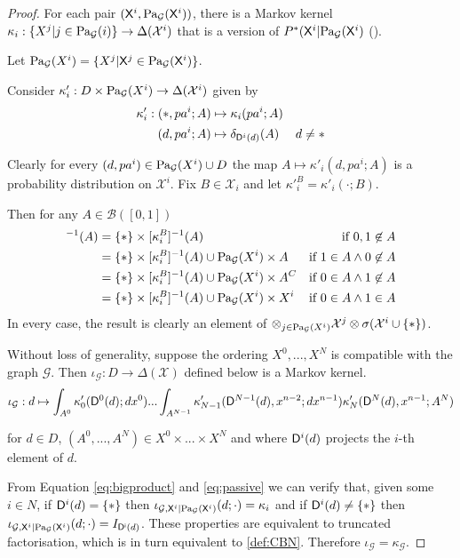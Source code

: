 \begin{proof}
For each pair $(\mathsf{X}^i,\text{Pa}_{\mathcal{G}}(\mathsf{X}^i))$, there is a Markov kernel $\kappa_i:\{X^j|j\in \text{Pa}_{\mathcal{G}}(i)\}\to \Delta(\mathcal{X}^i)$ that is a version of $P^*(\mathsf{X}^i|\text{Pa}_{\mathcal{G}}(\mathsf{X}^i)$ (\cite{cinlar_probability_2011}). 

Let $\text{Pa}_{\mathcal{G}}(X^i) = \{X^j|\mathsf{X}^j\in \text{Pa}_{\mathcal{G}}(\mathsf{X}^i)\}$.

Consider $\kappa'_i:D\times \text{Pa}_{\mathcal{G}}(X^i) \to \Delta(\mathcal{X}^i)$ given by \begin{align}
    \kappa'_i: (*,pa^i;A)&\mapsto \kappa_i(pa^i;A)&\label{eq:passive}\\
               (d,pa^i;A)&\mapsto \delta_{\mathsf{D}^i(d)}(A)&d\neq *\label{eq:npassive}
\end{align}

Clearly for every $(d,pa^i) \in \text{Pa}_{\mathcal{G}}(X^i)\cup D$ the map $A\mapsto \kappa'_i(d,pa^i;A)$ is a probability distribution on $\mathcal{X}^i$. Fix $B\in\mathcal{X}_i$ and let $\kappa'^B_i=\kappa'_i(\cdot;B)$.

Then for any $A\in \mathcal{B}([0,1])$
\begin{align}
    [\kappa'^B_i]^{-1}(A) &= \{*\}\times[\kappa^B_i]^{-1}(A) &\text{if }0,1\not\in A\\
    &= \{*\}\times[\kappa^B_i]^{-1}(A)\cup \PA{\mathcal{G}}{X^i}\times A &\text{if }1\in A\land 0\not\in A\\
    &= \{*\}\times[\kappa^B_i]^{-1}(A)\cup \PA{\mathcal{G}}{X^i}\times A^C &\text{if }0\in A\land 1\not\in A\\
    &= \{*\}\times[\kappa^B_i]^{-1}(A)\cup \PA{\mathcal{G}}{X^i}\times X^i &\text{if }0\in A\land 1\in A
\end{align}
In every case, the result is clearly an element of $\otimes_{j\in \text{Pa}_{\mathcal{G}}(X^i)} \mathcal{X}^j \otimes \sigma(\mathcal{X}^i\cup\{*\})$.

Without loss of generality, suppose the ordering $X^0,...,X^N$ is compatible with the graph $\mathcal{G}$. Then $\iota_{\mathcal{G}}:D\to \Delta(\mathcal{X})$ defined below is a Markov kernel.
\begin{align}
    \iota_{\mathcal{G}}:d\mapsto \int_{A^0} \kappa'_0(\mathsf{D}^0(d);dx^0) ... \int_{A^{N-1}} \kappa'_{N-1}(\mathsf{D}^{N-1}(d),x^{n-2};dx^{n-1}) \kappa'_N(\mathsf{D}^N(d),x^{n-1};A^N) \label{eq:bigproduct}
\end{align}

for $d\in D$, $(A^0,...,A^N)\in X^0\times...\times X^N$ and where $\mathsf{D}^i(d)$ projects the $i$-th element of $d$.

From Equation \ref{eq:bigproduct} and \ref{eq:passive} we can verify that, given some $i\in N$, if $\mathsf{D}^i(d)=\{*\}$ then $\iota_{\mathcal{G},\mathsf{X}^i|\text{Pa}_{\mathcal{G}}(\mathsf{X}^i)}(d;\cdot) = \kappa_i$ and if $\mathsf{D}^i(d)\neq\{*\}$ then $\iota_{\mathcal{G},\mathsf{X}^i|\text{Pa}_{\mathcal{G}}(\mathsf{X}^i)}(d;\cdot) = I_{\mathsf{D^i}(d)}$. These properties are equivalent to truncated factorisation, which is in turn equivalent to \ref{def:CBN}. Therefore $\iota_\mathcal{G}=\kappa_\mathcal{G}$.
\end{proof}

